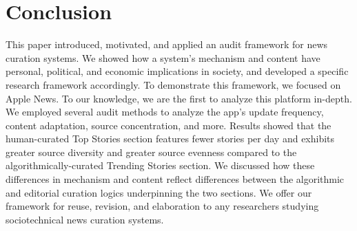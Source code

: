 \section{Conclusion}
This paper introduced, motivated, and applied an audit framework for news curation systems. We showed how a system's mechanism and content have personal, political, and economic implications in society, and developed a specific research framework accordingly. To demonstrate this framework, we focused on Apple News. To our knowledge, we are the first to analyze this platform in-depth. We employed several audit methods to analyze the app's update frequency, content adaptation, source concentration, and more. Results showed that the human-curated Top Stories section features fewer stories per day and exhibits greater source diversity and greater source evenness compared to the algorithmically-curated Trending Stories section. We discussed how these differences in mechanism and content reflect differences between the algorithmic and editorial curation logics underpinning the two sections.  We offer our framework for reuse, revision, and elaboration to any researchers studying sociotechnical news curation systems. 